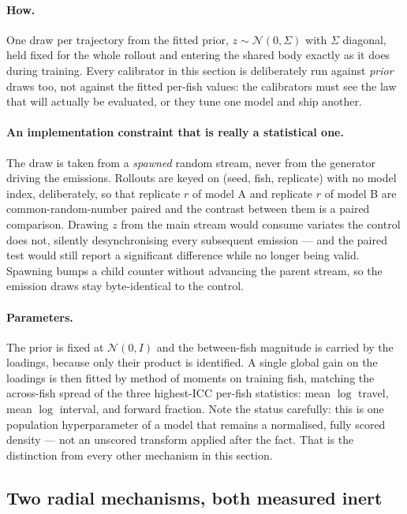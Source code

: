 \paragraph{How.} One draw per trajectory from the fitted prior, $z\sim\mathcal{N}(0,\Sigma)$ with
$\Sigma$ diagonal, held fixed for the whole rollout and entering the shared body exactly as it does
during training. Every calibrator in this section is deliberately run against \emph{prior} draws
too, not against the fitted per-fish values: the calibrators must see the law that will actually be
evaluated, or they tune one model and ship another.

\paragraph{An implementation constraint that is really a statistical one.} The draw is taken from a
\emph{spawned} random stream, never from the generator driving the emissions. Rollouts are keyed on
(seed, fish, replicate) with no model index, deliberately, so that replicate $r$ of model A and
replicate $r$ of model B are common-random-number paired and the contrast between them is a paired
comparison. Drawing $z$ from the main stream would consume variates the control does not, silently
desynchronising every subsequent emission --- and the paired test would still report a significant
difference while no longer being valid. Spawning bumps a child counter without advancing the parent
stream, so the emission draws stay byte-identical to the control.

\paragraph{Parameters.} The prior is fixed at $\mathcal{N}(0,I)$ and the between-fish magnitude is
carried by the loadings, because only their product is identified. A single global gain on the
loadings is then fitted by method of moments on training fish, matching the across-fish spread of
the three highest-ICC per-fish statistics: mean $\log$ travel, mean $\log$ interval, and forward
fraction. Note the status carefully: this is one population hyperparameter of a model that remains
a normalised, fully scored density --- not an unscored transform applied after the fact. That is
the distinction from every other mechanism in this section.


\subsection{Two radial mechanisms, both measured inert}

